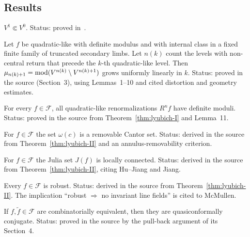 \subsection*{Results}

\begin{lemma}[Lemma~0]
\label{lem:lyubich-zero}
$V^1\Subset V^0$.  Status: proved in~\cite{LyubichGeometry}.
\end{lemma}

\begin{theorem}
\label{thm:lyubich-I}
Let $f$ be quadratic-like with definite modulus and with internal class in a
fixed finite family of truncated secondary limbs.  Let $n(k)$ count the levels
with non-central return that precede the $k$-th quadratic-like level.  Then
$\mu_{n(k)+1}=\operatorname{mod}(V^{n(k)}\setminus V^{n(k)+1})$ grows uniformly linearly
in $k$.  Status: proved in the source (Section~3), using Lemmas~1--10 and cited
distortion and geometry estimates.
\end{theorem}

\begin{theorem}
\label{thm:lyubich-II}
For every $f\in\mathcal F$, all quadratic-like renormalizations $R^nf$ have
definite moduli.  Status: proved in the source from Theorem~\ref{thm:lyubich-I}
and Lemma~11.
\end{theorem}

\begin{corollary}
\label{cor:lyubich-IIa}
For $f\in\mathcal F$ the set $\omega(c)$ is a removable Cantor set.  Status:
derived in the source from Theorem~\ref{thm:lyubich-II} and an annulus-removability
criterion.
\end{corollary}

\begin{corollary}
\label{cor:lyubich-IIb}
For $f\in\mathcal F$ the Julia set $J(f)$ is locally connected.  Status: derived
in the source from Theorem~\ref{thm:lyubich-II}, citing Hu--Jiang and Jiang.
\end{corollary}

\begin{corollary}
\label{cor:lyubich-IIc}
Every $f\in\mathcal F$ is robust.  Status: derived in the source from
Theorem~\ref{thm:lyubich-II}.  The implication ``robust $\Rightarrow$ no invariant
line fields'' is cited to McMullen.
\end{corollary}

\begin{theorem}
\label{thm:lyubich-III}
If $f,\tilde f\in\mathcal F$ are combinatorially equivalent, then they are
quasiconformally conjugate.  Status: proved in the source by the pull-back
argument of its Section~4.
\end{theorem}


